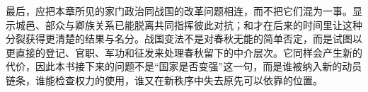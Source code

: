 最后，应把本章所见的家门政治同战国的改革问题相连，而不把它们混为一事。显示城邑、部众与卿族关系已能脱离共同指挥彼此对抗；和才在后来的时间里让这种分裂获得更清楚的结果与名分。战国变法不是对春秋无能的简单否定，而是试图以更直接的登记、官职、军功和征发来处理春秋留下的中介层次。它同样会产生新的代价，因此本书接下来的问题不是“国家是否变强”这一句，而是谁被纳入新的动员链条，谁能检查权力的使用，谁又在新秩序中失去原先可以依靠的位置。
